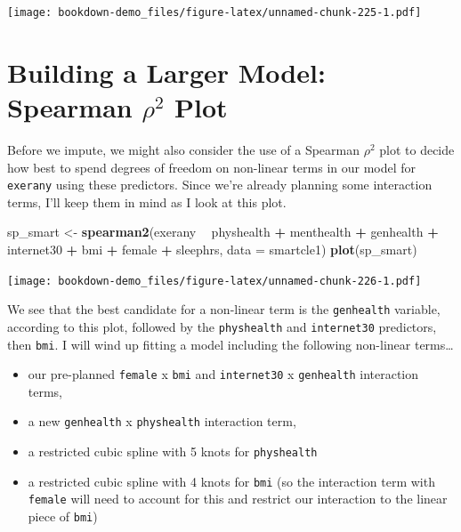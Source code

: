 \documentclass[]{book}
\newenvironment{Shaded}{\begin{snugshade}}{\end{snugshade}}
\newcommand{\KeywordTok}[1]{\textcolor[rgb]{0.13,0.29,0.53}{\textbf{#1}}}
\newcommand{\DataTypeTok}[1]{\textcolor[rgb]{0.13,0.29,0.53}{#1}}
\newcommand{\StringTok}[1]{\textcolor[rgb]{0.31,0.60,0.02}{#1}}
\newcommand{\OperatorTok}[1]{\textcolor[rgb]{0.81,0.36,0.00}{\textbf{#1}}}
\newcommand{\NormalTok}[1]{#1}
\providecommand{\tightlist}{%
  \setlength{\itemsep}{0pt}\setlength{\parskip}{0pt}}
\theoremstyle{definition}
\theoremstyle{definition}
\theoremstyle{definition}
\theoremstyle{remark}
\begin{document}
\texttt{[image: bookdown-demo\_files/figure-latex/unnamed-chunk-225-1.pdf]}

\section{\texorpdfstring{Building a Larger Model: Spearman \(\rho^2\)
Plot}{Building a Larger Model: Spearman \textbackslash{}rho\^{}2 Plot}}\label{building-a-larger-model-spearman-rho2-plot}

Before we impute, we might also consider the use of a Spearman
\(\rho^2\) plot to decide how best to spend degrees of freedom on
non-linear terms in our model for \texttt{exerany} using these
predictors. Since we're already planning some interaction terms, I'll
keep them in mind as I look at this plot.

\begin{Shaded}
\begin{Highlighting}[]
\NormalTok{sp_smart <-}\StringTok{ }\KeywordTok{spearman2}\NormalTok{(exerany }\OperatorTok{~}\StringTok{ }\NormalTok{physhealth }\OperatorTok{+}\StringTok{ }\NormalTok{menthealth }\OperatorTok{+}\StringTok{ }
\StringTok{                          }\NormalTok{genhealth }\OperatorTok{+}\StringTok{ }\NormalTok{internet30 }\OperatorTok{+}\StringTok{ }
\StringTok{                          }\NormalTok{bmi }\OperatorTok{+}\StringTok{ }\NormalTok{female }\OperatorTok{+}\StringTok{ }\NormalTok{sleephrs, }
                      \DataTypeTok{data =}\NormalTok{ smartcle1)}
\KeywordTok{plot}\NormalTok{(sp_smart)}
\end{Highlighting}
\end{Shaded}

\texttt{[image: bookdown-demo\_files/figure-latex/unnamed-chunk-226-1.pdf]}

We see that the best candidate for a non-linear term is the
\texttt{genhealth} variable, according to this plot, followed by the
\texttt{physhealth} and \texttt{internet30} predictors, then
\texttt{bmi}. I will wind up fitting a model including the following
non-linear terms\ldots{}

\begin{itemize}
\tightlist
\item
  our pre-planned \texttt{female} x \texttt{bmi} and \texttt{internet30}
  x \texttt{genhealth} interaction terms,
\item
  a new \texttt{genhealth} x \texttt{physhealth} interaction term,
\item
  a restricted cubic spline with 5 knots for \texttt{physhealth}
\item
  a restricted cubic spline with 4 knots for \texttt{bmi} (so the
  interaction term with \texttt{female} will need to account for this
  and restrict our interaction to the linear piece of \texttt{bmi})
\end{itemize}
\end{document}
